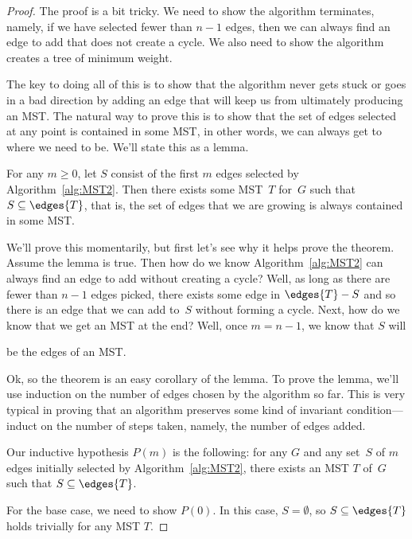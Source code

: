 \begin{proof}
The proof is a bit tricky.  We need to show the algorithm terminates,
namely, if we have selected fewer than $n - 1$ edges, then we can
always find an edge to add that does not create a cycle.  We also need
to show the algorithm creates a tree of minimum weight.

The key to doing all of this is to show that the algorithm never gets
stuck or goes in a bad direction by adding an edge that will keep us
from ultimately producing an MST\@.  The natural way to prove this is
to show that the set of edges selected at any point is contained in
some MST, in other words, we can always get to where we need to be.
We'll state this as a lemma.

\begin{lemma}\label{lemma:MST2}
  For any $m \ge 0$, let $S$ consist of the first $m$ edges selected by
  Algorithm~\ref{alg:MST2}.  Then there exists some MST~$T$ for~$G$ such
  that $S \subseteq \edges{T}$, that is, the set of edges that we are
  growing is always contained in some MST\@.
\end{lemma}

We'll prove this momentarily, but first let's see why it helps prove
the theorem.  Assume the lemma is true.  Then how do we know
Algorithm~\ref{alg:MST2} can always find an edge to add without
creating a cycle?  Well, as long as there are fewer than $n - 1$ edges
picked, there exists some edge in $\edges{T} - S$ and so there is an
edge that we can add to~$S$ without forming a cycle.  Next, how do we
know that we get an MST at the end?  Well, once $m = n - 1$, we know
that $S$ will
\begin{editingnotes}
\end{editingnotes}
be the edges of an MST.

Ok, so the theorem is an easy corollary of the lemma.  To prove the
lemma, we'll use induction on the number of edges chosen by the
algorithm so far.  This is very typical in proving that an algorithm
preserves some kind of invariant condition---induct on the number of
steps taken, namely, the number of edges added.

Our inductive hypothesis $P(m)$ is the following: for any $G$ and any
set~$S$ of $m$ edges initially selected by Algorithm~\ref{alg:MST2},
there exists an MST $T$ of~$G$ such that $S \subseteq \edges{T}$.

For the base case, we need to show $P(0)$.  In this case, $S =
\emptyset$, so $S \subseteq \edges{T}$ holds trivially for any MST
$T$.


\end{proof}
